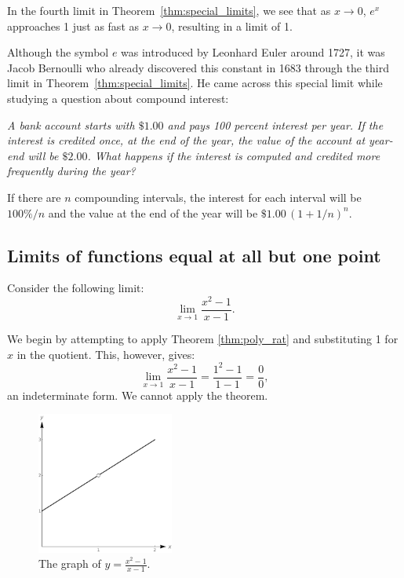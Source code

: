 In the fourth limit in Theorem~\ref{thm:special_limits}, we see that as $x\to 0$, $e^x$ approaches 1 just as fast as $x\to 0$, resulting in a limit of 1.\\

\begin{remark}
Although the symbol $e$ was introduced by Leonhard Euler around 1727, it was
Jacob Bernoulli who already discovered this constant in 1683 through the third limit in Theorem~\ref{thm:special_limits}. He came across this special limit while studying a question about compound interest:

\textit{A bank account starts with $\$1.00$ and pays 100 percent interest per year. If the interest is credited once, at the end of the year, the value of the account at year-end will be $\$2.00$. What happens if the interest is computed and credited more frequently during the year?}

If there are $n$ compounding intervals, the interest for each interval will be $100\%/n$ and the value at the end of the year will be $\$1.00\,(1 + 1/n)^n$.
\end{remark}
\fi



\subsection{Limits of functions equal at all but one point}
Consider the following limit: 
$$\lim_{x\to 1}\frac{x^2-1}{x-1}.$$

We begin by attempting to apply Theorem \ref{thm:poly_rat} and substituting 1 for $x$ in the quotient. This, however, gives:
		$$\lim_{x\to 1}\frac{x^2-1}{x-1} = \frac{1^2-1}{1-1} = \frac{0}{0},$$ 
an indeterminate form. We cannot apply the theorem.

\begin{figure}
	\begin{center}
			\includegraphics[width=0.4\textwidth]{fig_lim_11}
	\caption{The graph of $y=\frac{x^2-1}{x-1}$. }
	\label{fig_lim_11}
	\end{center}
\end{figure}



